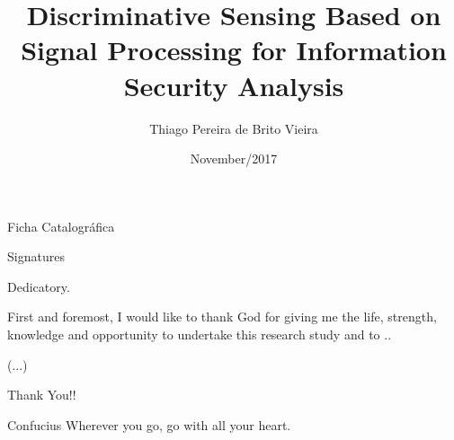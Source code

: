\documentclass[en, oneside, onehalfspacing]{risethesis}
\title{Discriminative Sensing Based on Signal Processing for Information Security Analysis}
\date{November/2017}
\author{Thiago Pereira de Brito Vieira}
\begin{document}
\frontmatter
\frontpage
\presentationpage

\begin{dedicatory}Ficha Catalográfica\end{dedicatory}

\begin{dedicatory}Signatures\end{dedicatory}

\begin{dedicatory}Dedicatory.\end{dedicatory}

\agradecimentos
First and foremost, I would like to thank God for giving me the life, strength, knowledge and opportunity to undertake this research study and to ..

(...)

Thank You!!

\begin{epigraph}[]{Confucius}
	Wherever you go, go with all your heart.
\end{epigraph}

\resumo


\abstract


\tableofcontents

\makeatletter
\renewcommand{\@thesubfigure}{\thesubfigure:\hskip\subfiglabelskip}
\makeatother
\setcounter{lofdepth}{2}

\listoffigures
\listoftables


\mainmatter
	






\appendix



	



\clearpage
\addappheadtotoc
\end{document}
